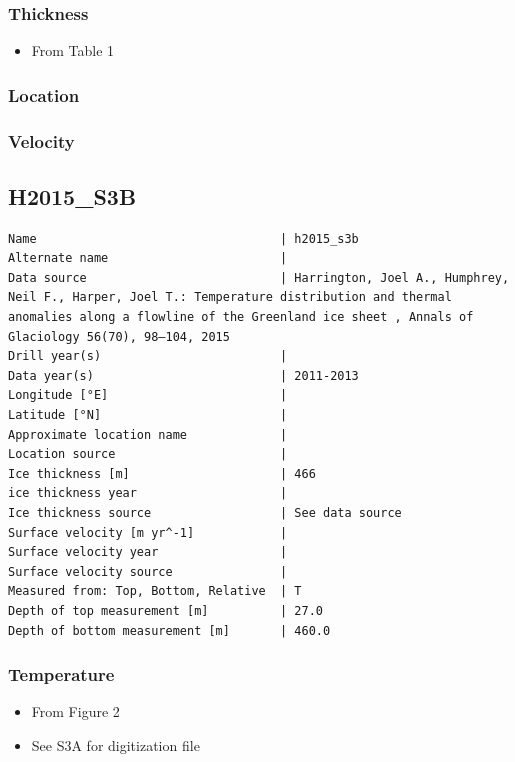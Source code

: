 \documentclass[article,a4paper,times,11pt,twoside]{article}
\begin{document}
\subsubsection{Thickness}
\label{sec:org88cc4c1}

\begin{itemize}
\item From \textcite{harrington_2015} Table 1
\end{itemize}

\subsubsection{Location}
\label{sec:org9163beb}

\subsubsection{Velocity}
\label{sec:org8cd8399}
\clearpage
\subsection{H2015\_S3B}
\label{sec:org6240b2d}
\begin{verbatim}
Name                                  | h2015_s3b
Alternate name                        | 
Data source                           | Harrington, Joel A., Humphrey, Neil F., Harper, Joel T.: Temperature distribution and thermal anomalies along a flowline of the Greenland ice sheet , Annals of Glaciology 56(70), 98–104, 2015 
Drill year(s)                         | 
Data year(s)                          | 2011-2013
Longitude [°E]                        | 
Latitude [°N]                         | 
Approximate location name             | 
Location source                       | 
Ice thickness [m]                     | 466
ice thickness year                    | 
Ice thickness source                  | See data source
Surface velocity [m yr^-1]            | 
Surface velocity year                 | 
Surface velocity source               | 
Measured from: Top, Bottom, Relative  | T
Depth of top measurement [m]          | 27.0
Depth of bottom measurement [m]       | 460.0
\end{verbatim}

\subsubsection{Temperature}
\label{sec:orgc987900}

\begin{itemize}
\item From \textcite{harrington_2015} Figure 2
\item See S3A for digitization file
\end{itemize}
\end{document}
